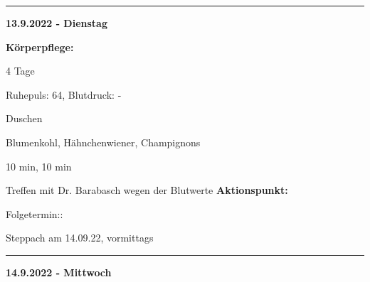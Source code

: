 \documentclass[10pt,a4paper]{article}
\newcommand\rele[1] {{\color {english} \bf {#1}}}         %
\newcommand\opti[1] {{\color {amethyst} {\bf #1}}}        %
\newcommand\mand[1] {{\color {burntorange} {\bf #1}}}     %
\newcommand\ddivide {\vskip -9pt \hrule \vskip 6pt}
\begin{document}
\ddivide
{\rele {13.9.2022 - Dienstag}}

\begin{mdframed}[style=daystyle]
  \begin{labeling}{{\mand {Körperpflege:}}}
    \setlength\itemsep{-3pt}
  \item[{\mand {Stimmung:}}]     
  \item[{\mand {Abstinenz:}}]    4 Tage
  \item[{\mand {Gesundheit:}}]   Ruhepuls: 64, Blutdruck: -
  \item[{\mand {Körperpflege:}}] Duschen
  \item[{\mand {Essen:}}]        Blumenkohl, Hähnchenwiener, Champignons
  \item[{\mand {Zazen:}}]        10 min, 10 min
  \item[{\opti {Hausarzt:}}]     Treffen mit Dr. Barabasch wegen der Blutwerte
    \vskip -2pt        
    {\bf Aktionspunkt:}    
    \vskip -2pt
    \begin{minipage}{0.75\textwidth}  
      \begin{labeling}{Folgetermin::} 
        \setlength\itemsep{-3pt}  
      \item[Folgetermin:] Steppach am 14.09.22, vormittags
      \end{labeling}
    \end{minipage}
  \end{labeling}
\end{mdframed}

  
\ddivide
{\rele {14.9.2022 - Mittwoch}}
\end{document}

